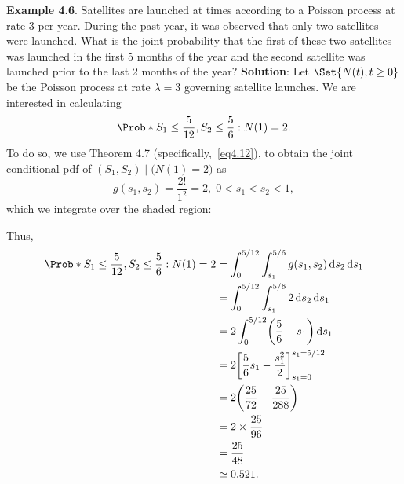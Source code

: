 \begin{Example}
    \textbf{Example 4.6}. Satellites are launched at times according to a Poisson process at rate 3 per
    year. During the past year, it was observed that only two satellites were launched. What is the
    joint probability that the first of these two satellites was launched in the first 5 months of the
    year and the second satellite was launched prior to the last 2 months of the year?
    \tcblower{}
    \textbf{Solution}: Let $ \Set{N(t),t\ge 0} $ be the Poisson process at rate $ \lambda=3 $
    governing satellite launches. We are interested in calculating
    \[ \Prob*{S_1\le \frac{5}{12},S_2\le \frac{5}{6}\given N(1)=2}. \]
    To do so, we use Theorem 4.7 (specifically,~\ref{eq4.12}), to obtain the joint
    conditional pdf of $ (S_1,S_2)\mid\bigl(N(1)=2\bigr) $ as
    \[ g(s_1,s_2)=\frac{2!}{1^2}=2,\; 0<s_1<s_2<1, \]
    which we integrate over the shaded region:
    \begin{center}
    \end{center}
    Thus,
    \begin{align*}
        \Prob*{S_1\le \frac{5}{12},S_2\le \frac{5}{6}\given N(1)=2}
         & =\int_{0}^{5/12}\int_{s_1}^{5/6}g(s_1,s_2)\odif{s_2}\odif{s_1}    \\
         & =\int_{0}^{5/12}\int_{s_1}^{5/6}2\odif{s_2}\odif{s_1}             \\
         & =2\int_{0}^{5/12}\biggl(\frac{5}{6}-s_1\biggr)\odif{s_1}          \\
         & =2\biggl[\frac{5}{6}s_1-\frac{s_1^2}{2}\biggr]_{s_1=0}^{s_1=5/12} \\
         & =2\biggl(\frac{25}{72}-\frac{25}{288}\biggr)                      \\
         & =2\times \frac{25}{96}                                            \\
         & =\frac{25}{48}                                                    \\
         & \simeq 0.521.
    \end{align*}
\end{Example}